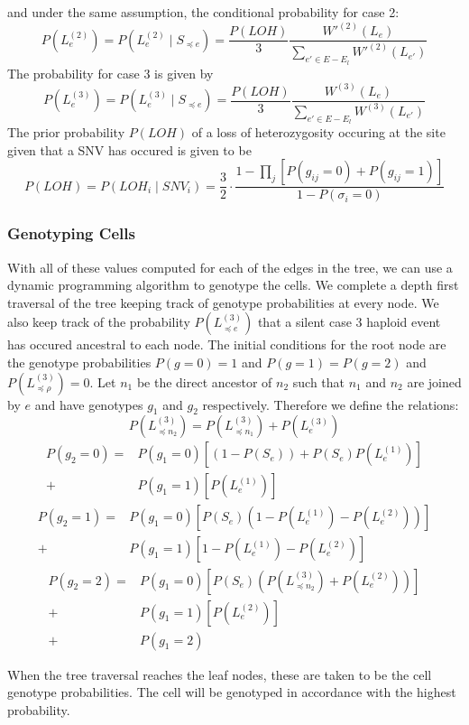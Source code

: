 \documentclass[../../main.tex]{subfiles}
\begin{document}
and under the same assumption, the conditional probability for case 2:
\begin{equation*}
P(L_e^{(2)}) = P(L_e^{(2)}\mid S_{\preceq e}) = \frac{P(LOH)}{3} \frac{W'^{(2)}(L_e)}{\sum_{e'\in E-E_l}W'^{(2)}(L_{e'})}
\end{equation*}
The probability for case 3 is given by
\begin{equation*}
P(L_e^{(3)}) = P(L_e^{(3)}\mid S_{\preceq e}) = \frac{P(LOH)}{3} \frac{W^{(3)}(L_e)}{\sum_{e'\in E-E_l}W^{(3)}(L_{e'})}
\end{equation*}
The prior probability $P(LOH)$ of a loss of heterozygosity occuring at the site given that a SNV has occured is given to be
\begin{equation*}
P(LOH) = P(LOH_i \mid SNV_i) = \frac{3}{2}\cdot\frac{1-\prod_j\left[P(g_{ij}=0)+P(g_{ij}=1)\right]}{1-P(\sigma_i = 0)}
\end{equation*}

\subsubsection*{Genotyping Cells}
With all of these values computed for each of the edges in the tree, we can use a dynamic programming algorithm to genotype the cells. We complete a depth first traversal of the tree keeping track of genotype probabilities at every node. We also keep track of the probability $P(L_{\preceq e}^{(3)})$ that a silent case 3 haploid event has occured ancestral to each node. The initial conditions for the root node are the genotype probabilities $P(g=0)=1$ and $P(g=1)=P(g=2)$ and $P(L_{\preceq \rho}^{(3)}) = 0$. Let $n_1$ be the direct ancestor of $n_2$ such that $n_1$ and $n_2$ are joined by $e$ and have genotypes $g_1$ and $g_2$ respectively. Therefore we define the relations:
\begin{equation*}
P(L^{(3)}_{\preceq n_2}) = P(L^{(3)}_{\preceq n_1}) +P(L^{(3)}_e)
\end{equation*}
\begin{align*}
P(g_2 = 0) = &P(g_1=0)\left[(1-P(S_e))+P(S_e)P(L^{(1)}_e)\right]\\
+ &P(g_1 = 1)\left[P(L^{(1)}_e)\right]
\end{align*}
\begin{align*}
P(g_2 = 1) = &P(g_1=0)\left[P(S_e)(1-P(L^{(1)}_e)-P(L^{(2)}_e))\right]\\
+ &P(g_1 = 1)\left[1-P(L^{(1)}_e)-P(L^{(2)}_e)\right]
\end{align*}
\begin{align*}
P(g_2=2) = &P(g_1=0)\left[P(S_e)(P(L^{(3)}_{\preceq n_2}) + P(L^{(2)}_e))\right]\\
+ &P(g_1=1)\left[P(L^{(2)}_e)\right]\\
+ &P(g_1=2)
\end{align*}

When the tree traversal reaches the leaf nodes, these are taken to be the cell genotype probabilities. The cell will be genotyped in accordance with the highest probability.
\end{document}
